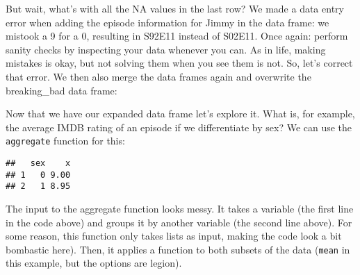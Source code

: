 \documentclass[
]{article}
\newenvironment{Shaded}{\begin{snugshade}}{\end{snugshade}}
\newcommand{\AttributeTok}[1]{\textcolor[rgb]{0.77,0.63,0.00}{#1}}
\newcommand{\ConstantTok}[1]{\textcolor[rgb]{0.00,0.00,0.00}{#1}}
\newcommand{\FunctionTok}[1]{\textcolor[rgb]{0.00,0.00,0.00}{#1}}
\newcommand{\NormalTok}[1]{#1}
\newcommand{\OtherTok}[1]{\textcolor[rgb]{0.56,0.35,0.01}{#1}}
\newcommand{\SpecialCharTok}[1]{\textcolor[rgb]{0.00,0.00,0.00}{#1}}
\newcommand{\StringTok}[1]{\textcolor[rgb]{0.31,0.60,0.02}{#1}}
\begin{document}
But wait, what's with all the NA values in the last row? We made a data
entry error when adding the episode information for Jimmy in the data
frame: we mistook a 9 for a 0, resulting in S92E11 instead of S02E11.
Once again: perform sanity checks by inspecting your data whenever you
can. As in life, making mistakes is okay, but not solving them when you
see them is not. So, let's correct that error. We then also merge the
data frames again and overwrite the breaking\_bad data frame:

\begin{Shaded}
\end{Shaded}

Now that we have our expanded data frame let's explore it. What is, for
example, the average IMDB rating of an episode if we differentiate by
sex? We can use the \texttt{aggregate} function for this:

\begin{Shaded}
\end{Shaded}

\begin{verbatim}
##   sex    x
## 1   0 9.00
## 2   1 8.95
\end{verbatim}

The input to the aggregate function looks messy. It takes a variable
(the first line in the code above) and groups it by another variable
(the second line above). For some reason, this function only takes lists
as input, making the code look a bit bombastic here). Then, it applies a
function to both subsets of the data (\texttt{mean} in this example, but
the options are legion).
\end{document}
